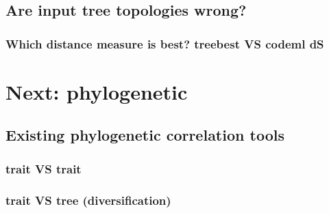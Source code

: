 \documentclass[a4paper]{beamer}
\begin{document}
\subsection{Are input tree topologies wrong?}
\subsubsection{Which distance measure is best? treebest VS codeml dS}\begin{frame}{}\end{frame}

\section[Correlation between duplication and diversification]{Next: phylogenetic}
\subsection{Existing phylogenetic correlation tools}\begin{frame}{}\end{frame}
\subsubsection{trait VS trait}\begin{frame}{}\end{frame}
\subsubsection{trait VS tree (diversification)}\begin{frame}{}\end{frame}
\end{document}
